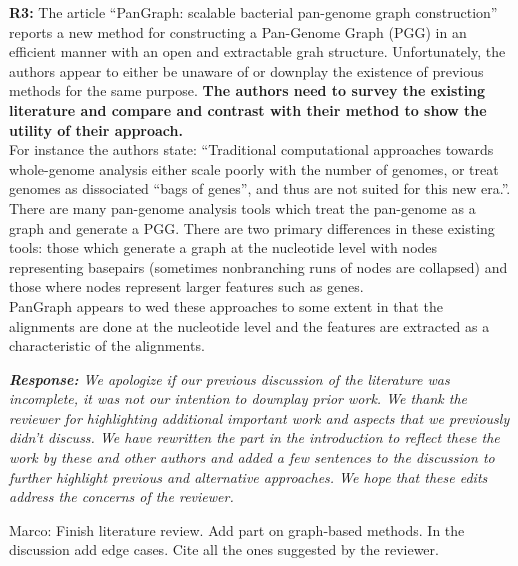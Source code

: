 \documentclass[aps,rmp,onecolumn]{revtex4-1}
\newcommand{\Marco}[1]{{\color{orange}Marco: #1}}
\newcommand{\reviewer}[2]{\textbf{#1:} #2\vskip 5mm}
\newcommand{\response}[1]{{\it {\color{response}\textbf{Response:} #1}}\vskip 5mm}
\begin{document}
\reviewer{R3}{The article ``PanGraph: scalable bacterial pan-genome graph construction'' reports a new method for constructing a Pan-Genome Graph (PGG) in an efficient manner with an open and extractable grah structure. Unfortunately, the authors appear to either be unaware of or downplay the existence of previous methods for the same purpose.\textbf{ The authors need to survey the existing literature and compare and contrast with their method to show the utility of their approach.}\\
      For instance the authors state: ``Traditional computational approaches towards whole-genome analysis either scale poorly with the number of genomes, or treat genomes as dissociated ``bags of genes'', and thus are not suited for this new era.''. There are many pan-genome analysis tools which treat the pan-genome as a graph and generate a PGG. There are two primary differences in these existing tools: those which generate a graph at the nucleotide level with nodes representing basepairs (sometimes nonbranching runs of nodes are collapsed) and those where nodes represent larger features such as genes.\\
      PanGraph appears to wed these approaches to some extent in that the alignments are done at the nucleotide level and the features are extracted as a characteristic of the alignments.}

\response{
      We apologize if our previous discussion of the literature was incomplete, it was not our intention to downplay prior work.
      We thank the reviewer for highlighting additional important work and aspects that we previously didn't discuss.
      We have rewritten the part in the introduction to reflect these the work by these and other authors and added a few sentences to the discussion to further highlight previous and alternative approaches. We hope that these edits address the concerns of the reviewer.
}

\Marco{
      Finish literature review.
      Add part on graph-based methods.
      In the discussion add edge cases.
      Cite all the ones suggested by the reviewer.
}
\end{document}
